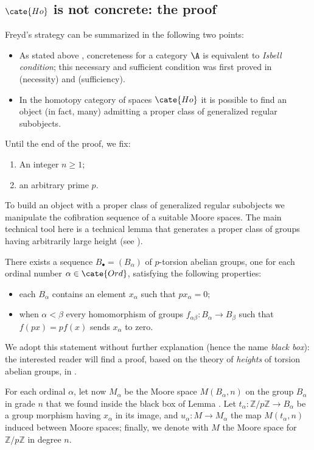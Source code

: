 \subsection{$\cate{Ho}$ is not concrete: the proof}
Freyd's strategy can be summarized in the following two points:
\begin{itemize}
	\item As stated above , concreteness for a category $\A$ is equivalent to \emph{Isbell condition}; this necessary and sufficient condition was first proved in \cite{Isbell1964} (necessity) and \cite{fconc} (sufficiency).
	\item In the homotopy category of spaces $\cate{Ho}$ it is possible to find an object (in fact, many) admitting a proper class of generalized regular subobjects.
\end{itemize}
Until the end of the proof, we fix:
\begin{enumerate}
	\item An integer $n\ge 1$;
	\item an arbitrary prime $p$.
\end{enumerate}
To build an object with a proper class of generalized regular subobjects we manipulate the cofibration sequence of a suitable Moore spaces. The main technical tool here is a technical lemma that generates a proper class of groups having arbitrarily large height (see \cite{fuchs2015abelian}). 
\begin{lemma}\label{spastic}
There exists a sequence $B_\bullet = (B_\alpha)$ of $p$-torsion abelian groups, one for each ordinal number $\alpha\in\cate{Ord}$, satisfying the following properties:
\begin{itemize}
	\item each $B_\alpha$ contains an element $x_\alpha$ such that $p x_\alpha = 0$;
	\item when $\alpha < \beta$ every homomorphism of groups $f_{\alpha\beta} \colon B_\alpha \to B_\beta$ such that $f(px)=p f(x)$ sends $x_\alpha$ to zero.
\end{itemize}
\end{lemma}
We adopt this statement without further explanation (hence the name \emph{black box}): the interested reader will find a proof, based on the theory of \emph{heights} of torsion abelian groups, in \cite{Freydconc}.
\begin{notat}
For each ordinal $\alpha$, let now $M_\alpha$ be the Moore space $M(B_\alpha,n)$ on the group $B_\alpha$  in grade $n$ that we found inside the black box of Lemma . Let $t_\alpha\colon \mathbb{Z}/p\mathbb{Z} \to B_\alpha$ be a group morphism having $x_\alpha$ in its image, and $u_\alpha\colon M \to M_\alpha$ the map $M(t_\alpha,n)$ induced between Moore spaces; finally, we denote with $M$ the Moore space for $\mathbb{Z}/p\mathbb{Z}$ in degree $n$.
\end{notat}
